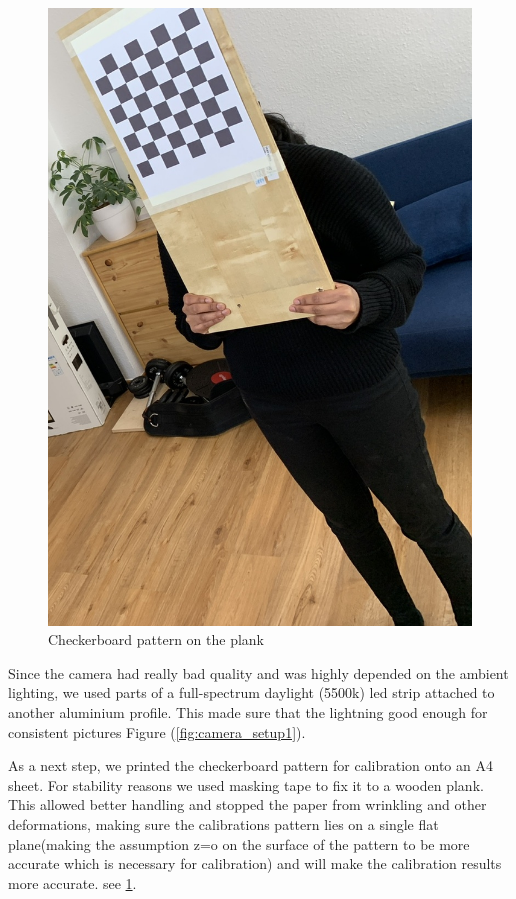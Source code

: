       \begin{figure}[H] 
            \centering
            \includegraphics[scale=0.2]{images/experiment_4/IMG_1327.jpg}
              \caption{Checkerboard pattern on the plank}
            \label{fig:camera_setup3}
     \end{figure}
     
    Since the camera had really bad quality and was highly depended on the ambient lighting, we used parts of a full-spectrum daylight (5500k) led strip attached to another aluminium profile. This made sure that the lightning good enough for consistent pictures Figure (\ref{fig:camera_setup1}).
     
    As a next step, we printed the checkerboard pattern for calibration onto an A4 sheet. For stability reasons we used masking tape to fix it to a wooden plank. This allowed better handling and stopped the paper from wrinkling and other deformations, making sure the calibrations pattern lies on a single flat plane(making the assumption z=o on the surface of the pattern to be more accurate which is necessary for calibration) and will make the calibration results more accurate. see \ref{fig:camera_setup3}.
    
